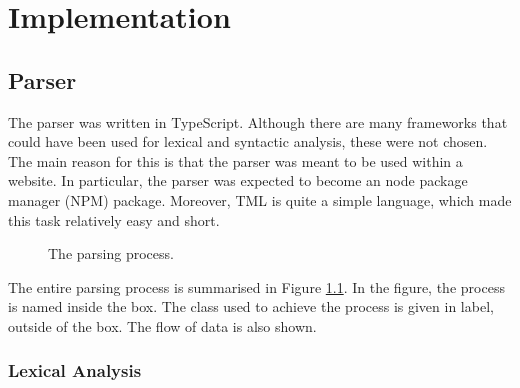\chapter{Implementation}
\section{Parser}

The parser was written in TypeScript. Although there are many frameworks that could have been used for lexical and syntactic analysis, these were not chosen. The main reason for this is that the parser was meant to be used within a website. In particular, the parser was expected to become an node package manager (NPM) package. Moreover, TML is quite a simple language, which made this task relatively easy and short.

\begin{figure}[htb]
    \centering
    \caption{The parsing process.}
    \label{fig:parsing_process}
\end{figure}

The entire parsing process is summarised in Figure \ref{fig:parsing_process}. In the figure, the process is named inside the box. The class used to achieve the process is given in label, outside of the box. The flow of data is also shown.

\subsection{Lexical Analysis}

